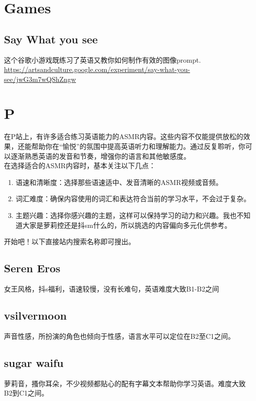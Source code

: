 \documentclass[11pt]{article}
\date{\today}
\title{}
\begin{document}
\tableofcontents


\section{Games}
\label{sec:org491fdcb}
\subsection{Say What you see}
\label{sec:orgef6dba1}
这个谷歌小游戏既练习了英语又教你如何制作有效的图像prompt. \\
\url{https://artsandculture.google.com/experiment/say-what-you-see/jwG3m7wQShZngw}

\section{P}
\label{sec:orga77b949}
在P站上，有许多适合练习英语能力的ASMR内容。这些内容不仅能提供放松的效果，还能帮助你在“愉悦”的氛围中提高英语听力和理解能力。通过反复聆听，你可以逐渐熟悉英语的发音和节奏，增强你的语言和其他敏感度。\\
在选择适合的ASMR内容时，基本关注以下几点：
\begin{enumerate}
\item 语速和清晰度：选择那些语速适中、发音清晰的ASMR视频或音频。
\item 词汇难度：确保内容使用的词汇和表达符合当前的学习水平，不会过于复杂。
\item 主题兴趣：选择你感兴趣的主题，这样可以保持学习的动力和兴趣。我也不知道大家是萝莉控还是抖sm什么的，所以挑选的内容偏向多元化供参考。
\end{enumerate}
开始吧！以下直接站内搜索名称即可搜出。
\subsection{Seren Eros}
\label{sec:org19495a0}
女王风格，抖s福利，语速较慢，没有长难句，英语难度大致B1-B2之间

\subsection{vsilvermoon}
\label{sec:org823c50d}
声音性感，所扮演的角色也倾向于性感，语言水平可以定位在B2至C1之间。

\subsection{sugar waifu}
\label{sec:orgee79773}
萝莉音，搔你耳朵，不少视频都贴心的配有字幕文本帮助你学习英语。难度大致B2到C1之间。
\end{document}
